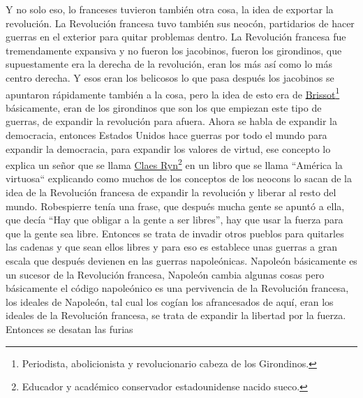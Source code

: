 Y no solo eso, lo franceses tuvieron también otra cosa, la idea de exportar la revolución. La Revolución francesa tuvo también sus neocón, partidarios de hacer guerras en el exterior para quitar problemas dentro. La Revolución francesa fue tremendamente expansiva y no fueron los jacobinos, fueron los girondinos, que supuestamente era la derecha
de la revolución, eran los más así como lo más centro derecha. Y esos eran los belicosos lo que pasa después los jacobinos se apuntaron rápidamente también a la cosa, pero la idea de esto era de \href{https://en.wikipedia.org/wiki/Jacques_Pierre_Brissot}{Brissot}\footnote{Periodista, abolicionista y revolucionario cabeza de los Girondinos.} básicamente, eran de los girondinos que son los que empiezan este tipo de guerras, de expandir la revolución para afuera. Ahora se habla de expandir la democracia, entonces Estados Unidos hace guerras por todo el mundo para expandir la democracia, para expandir los valores de virtud, ese concepto lo explica un señor que se llama \href{https://en.wikipedia.org/wiki/Claes_G._Ryn}{Claes Ryn}\footnote{Educador y académico conservador estadounidense nacido sueco.} en un libro que se llama ``América la virtuosa``\cite{ryn2003america} explicando como muchos de los conceptos de los neocons lo sacan de la idea de la Revolución francesa de expandir la revolución y liberar al resto del mundo. Robespierre tenía una frase, que después mucha gente se apuntó a ella, que decía \enquote{Hay que obligar a la gente a ser libres}, hay que usar la fuerza para que la gente sea libre. Entonces se trata de invadir otros pueblos para quitarles las cadenas y que sean ellos libres y para eso es establece unas guerras a gran escala que después devienen en las guerras napoleónicas. Napoleón básicamente es un sucesor de la Revolución francesa, Napoleón cambia algunas cosas pero básicamente el código napoleónico es una pervivencia de la Revolución francesa, los ideales de Napoleón, tal cual los cogían los afrancesados de aquí, eran los ideales de la Revolución francesa, se trata de expandir la libertad por la fuerza. Entonces se desatan las furias
